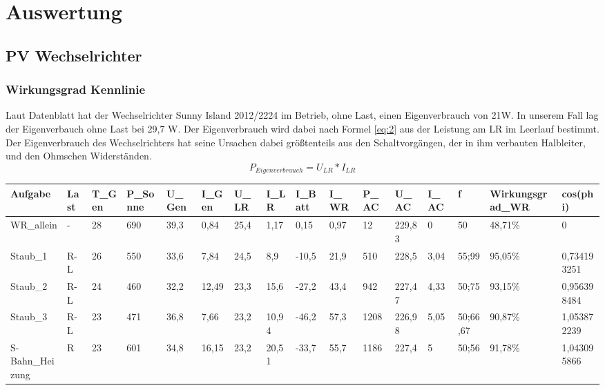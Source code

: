 \section{Auswertung}
\subsection{PV Wechselrichter}
\subsubsection{Wirkungsgrad Kennlinie}
Laut Datenblatt hat der Wechselrichter Sunny Island 2012/2224 im Betrieb, ohne Last, einen Eigenverbrauch von 21W. In unserem Fall lag der Eigenverbauch ohne Last bei 29,7 W. Der Eigenverbrauch wird dabei nach Formel \ref{eq:2} aus der Leistung am LR im Leerlauf bestimmt. Der Eigenverbrauch des Wechselrichters hat seine Ursachen dabei größtenteils aus den Schaltvorgängen, der in ihm verbauten Halbleiter, und den Ohmschen Widerständen.
%
\begin{equation}
	P_{ Eigenverbrauch }= U_{ LR} * I_{ LR }
\label{eq:2}
\end{equation} 
%
\begin{table}[!ht]
    \centering
    \begin{tabular}{|l|l|l|l|l|l|l|l|l|l|l|l|l|l|l|l|}
    \hline
        Aufgabe & Last & T\_Gen & P\_Sonne & U\_Gen & I\_Gen & U\_LR & I\_LR & I\_Batt & I\_WR & P\_AC & U\_AC & I\_AC & f & Wirkungsgrad\_WR & cos(phi) \\ \hline
        WR\_allein & - & 28 & 690 & 39,3 & 0,84 & 25,4 & 1,17 & 0,15 & 0,97 & 12 & 229,83 & 0 & 50 & 48,71\% & 0 \\ \hline
        Staub\_1 & R-L & 26 & 550 & 33,6 & 7,84 & 24,5 & 8,9 & -10,5 & 21,9 & 510 & 228,5 & 3,04 & 55;99 & 95,05\% & 0,734193251 \\ \hline
        Staub\_2 & R-L & 24 & 460 & 32,2 & 12,49 & 23,3 & 15,6 & -27,2 & 43,4 & 942 & 227,47 & 4,33 & 50;75 & 93,15\% & 0,956398484 \\ \hline
        Staub\_3 & R-L & 23 & 471 & 36,8 & 7,66 & 23,2 & 10,94 & -46,2 & 57,3 & 1208 & 226,98 & 5,05 & 50;66,67 & 90,87\% & 1,053872239 \\ \hline
        S-Bahn\_Heizung & R & 23 & 601 & 34,8 & 16,15 & 23,2 & 20,51 & -33,7 & 55,7 & 1186 & 227,4 & 5 & 50;56 & 91,78\% & 1,043095866 \\ \hline
    \end{tabular}
\end{table}

